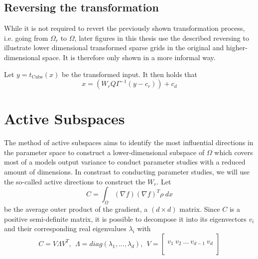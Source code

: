 \documentclass[
  a4paper,  %
  twoside,  %
  bibliography=totoc,
  headsepline,
  cleardoublepage=empty,
  parskip=half,
  draft=false
]{scrbook}
\begin{document}
\subsection{Reversing the transformation}

While it is not required to revert the previously shown transformation process, i.e. going from $\Omega_r$ to $\Omega$, later figures in this thesis use the described reversing to illustrate lower dimensional transformed sparse grids in the original and higher-dimensional space.
It is therefore only shown in a more informal way.

Let $y=t_{\text{Cube}}(x)$ be the transformed input. It then holds that
\begin{equation}
x=(W_r Q \Gamma^{-1} (y - c_r)) + c_d
\end{equation}

\section{Active Subspaces}


The method of active subspaces \cite{CG15} aims to identify the most influential directions in the parameter space to construct a lower-dimensional subspace of $\Omega$ which covers most of a models output variance to conduct parameter studies with a reduced amount of dimensions.
In constrast to conducting parameter studies, we will use the so-called active directions to construct the $W_r$.
Let
\begin{equation}
C = \int_{\Omega} (\nabla f) (\nabla f)^T \rho ~ dx
\label{as_c}
\end{equation}
be the average outer product of the gradient, a $(d \times d)$ matrix.
Since $C$ is a positive semi-definite matrix, it is possible to decompose it into its eigenvectors $v_i$ and their corresponding real eigenvalues $\lambda_i$ with
\begin{equation}
C = V \Lambda V^T, ~~ \Lambda = diag(\lambda_1, ..., \lambda_d), ~~ V=
  \begin{bmatrix}
  \\
    v_1 ~ v_2 ~ \dots ~ v_{d-1} ~ v_d\\
    \\
  \end{bmatrix}
\nonumber
\end{equation}
\end{document}
